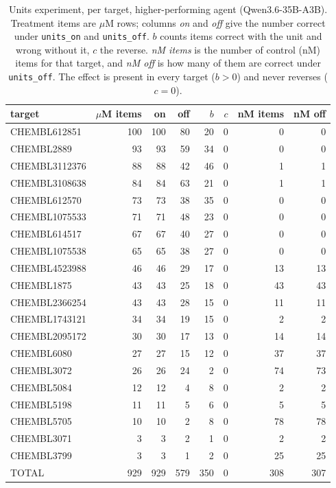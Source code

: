 \documentclass[sigconf]{ceurart}
\begin{document}
\begin{table}[t]
\centering
\small
\caption{Units experiment, per target, higher-performing agent (Qwen3.6-35B-A3B).
Treatment items are $\mu$M rows; columns \emph{on} and \emph{off} give the number
correct under \texttt{units\_on} and \texttt{units\_off}. $b$ counts items correct
with the unit and wrong without it, $c$ the reverse. \emph{nM items} is the number
of control (nM) items for that target, and \emph{nM off} is how many of them are
correct under \texttt{units\_off}. The effect is present in every target ($b>0$)
and never reverses ($c=0$).}
\label{tab:pertarget}
\begin{tabular}{lrrrrrrr}
\toprule
target & $\mu$M items & on & off & $b$ & $c$ & nM items & nM off \\
\midrule
CHEMBL612851 & 100 & 100 & 80 & 20 & 0 & 0 & 0 \\
CHEMBL2889 & 93 & 93 & 59 & 34 & 0 & 0 & 0 \\
CHEMBL3112376 & 88 & 88 & 42 & 46 & 0 & 1 & 1 \\
CHEMBL3108638 & 84 & 84 & 63 & 21 & 0 & 1 & 1 \\
CHEMBL612570 & 73 & 73 & 38 & 35 & 0 & 0 & 0 \\
CHEMBL1075533 & 71 & 71 & 48 & 23 & 0 & 0 & 0 \\
CHEMBL614517 & 67 & 67 & 40 & 27 & 0 & 0 & 0 \\
CHEMBL1075538 & 65 & 65 & 38 & 27 & 0 & 0 & 0 \\
CHEMBL4523988 & 46 & 46 & 29 & 17 & 0 & 13 & 13 \\
CHEMBL1875 & 43 & 43 & 25 & 18 & 0 & 43 & 43 \\
CHEMBL2366254 & 43 & 43 & 28 & 15 & 0 & 11 & 11 \\
CHEMBL1743121 & 34 & 34 & 19 & 15 & 0 & 2 & 2 \\
CHEMBL2095172 & 30 & 30 & 17 & 13 & 0 & 14 & 14 \\
CHEMBL6080 & 27 & 27 & 15 & 12 & 0 & 37 & 37 \\
CHEMBL3072 & 26 & 26 & 24 & 2 & 0 & 74 & 73 \\
CHEMBL5084 & 12 & 12 & 4 & 8 & 0 & 2 & 2 \\
CHEMBL5198 & 11 & 11 & 5 & 6 & 0 & 5 & 5 \\
CHEMBL5705 & 10 & 10 & 2 & 8 & 0 & 78 & 78 \\
CHEMBL3071 & 3 & 3 & 2 & 1 & 0 & 2 & 2 \\
CHEMBL3799 & 3 & 3 & 1 & 2 & 0 & 25 & 25 \\
\midrule
TOTAL & 929 & 929 & 579 & 350 & 0 & 308 & 307 \\
\bottomrule
\end{tabular}
\end{table}
\end{document}
